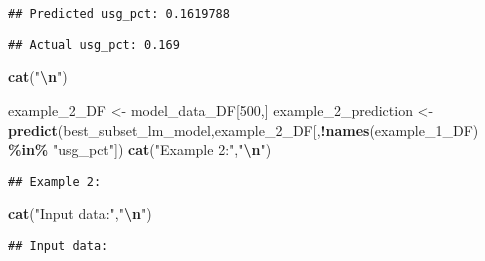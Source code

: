 \documentclass[
]{article}
\newenvironment{Shaded}{\begin{snugshade}}{\end{snugshade}}
\newcommand{\DecValTok}[1]{\textcolor[rgb]{0.00,0.00,0.81}{#1}}
\newcommand{\FunctionTok}[1]{\textcolor[rgb]{0.13,0.29,0.53}{\textbf{#1}}}
\newcommand{\NormalTok}[1]{#1}
\newcommand{\OtherTok}[1]{\textcolor[rgb]{0.56,0.35,0.01}{#1}}
\newcommand{\SpecialCharTok}[1]{\textcolor[rgb]{0.81,0.36,0.00}{\textbf{#1}}}
\newcommand{\StringTok}[1]{\textcolor[rgb]{0.31,0.60,0.02}{#1}}
\begin{document}
\begin{verbatim}
## Predicted usg_pct: 0.1619788
\end{verbatim}

\begin{Shaded}
\end{Shaded}

\begin{verbatim}
## Actual usg_pct: 0.169
\end{verbatim}

\begin{Shaded}
\begin{Highlighting}[]
\FunctionTok{cat}\NormalTok{(}\StringTok{"}\SpecialCharTok{\textbackslash{}n}\StringTok{"}\NormalTok{)}
\end{Highlighting}
\end{Shaded}

\begin{Shaded}
\begin{Highlighting}[]
\NormalTok{example\_2\_DF }\OtherTok{\textless{}{-}}\NormalTok{ model\_data\_DF[}\DecValTok{500}\NormalTok{,]}
\NormalTok{example\_2\_prediction }\OtherTok{\textless{}{-}} 
  \FunctionTok{predict}\NormalTok{(best\_subset\_lm\_model,example\_2\_DF[,}\SpecialCharTok{!}\FunctionTok{names}\NormalTok{(example\_1\_DF) }\SpecialCharTok{\%in\%} \StringTok{"usg\_pct"}\NormalTok{])}
\FunctionTok{cat}\NormalTok{(}\StringTok{"Example 2:"}\NormalTok{,}\StringTok{"}\SpecialCharTok{\textbackslash{}n}\StringTok{"}\NormalTok{)}
\end{Highlighting}
\end{Shaded}

\begin{verbatim}
## Example 2:
\end{verbatim}

\begin{Shaded}
\begin{Highlighting}[]
\FunctionTok{cat}\NormalTok{(}\StringTok{"Input data:"}\NormalTok{,}\StringTok{"}\SpecialCharTok{\textbackslash{}n}\StringTok{"}\NormalTok{)}
\end{Highlighting}
\end{Shaded}

\begin{verbatim}
## Input data:
\end{verbatim}
\end{document}
